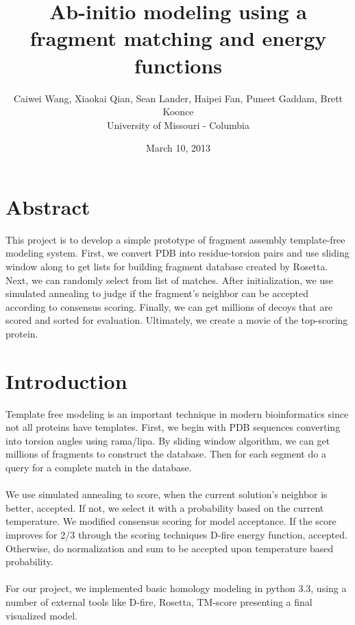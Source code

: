 \documentclass{article}
\title{Ab-initio modeling using a fragment matching and energy functions}
\author{Caiwei Wang, Xiaokai Qian, Sean Lander, Haipei Fan, Puneet Gaddam, Brett Koonce\\University of Missouri - Columbia}
\date{March 10, 2013}
\begin{document}
\maketitle

\section{Abstract}
This project is to develop a simple prototype of fragment assembly template-free modeling system. First, we convert PDB into residue-torsion pairs and use sliding window along to get lists for building fragment database created by Rosetta. Next, we can randomly select from list of matches. After initialization, we use simulated annealing to judge if the fragment’s neighbor can be accepted according to consensus scoring. Finally, we can get millions of decoys that are scored and sorted for evaluation. Ultimately, we create a movie of the top-scoring protein.

\section{Introduction}

Template free modeling is an important technique in modern bioinformatics since not all proteins have templates. First, we begin with PDB sequences converting into torsion angles using rama/lipa. By sliding window algorithm, we can get millions of fragments to construct the database. Then for each segment do a query for a complete match in the database.\\\\
We use simulated annealing to score, when the current solution’s neighbor is better, accepted. If not, we select it with a probability based on the current temperature. We modified consensus scoring for model acceptance. If the score improves for 2/3 through the scoring techniques D-fire energy function, accepted. Otherwise, do normalization and sum to be accepted upon temperature based probability.\\\\
For our project, we implemented basic homology modeling in python 3.3, using a number of external tools like D-fire, Rosetta, TM-score presenting a final visualized model.
\end{document}
